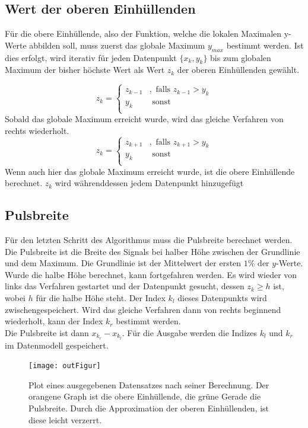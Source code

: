 \subsection{Wert der oberen Einhüllenden}\label{subsec:wert-der-oberen-einhüllenden}
Für die obere Einhüllende, also der Funktion, welche die lokalen Maximalen y-Werte abbilden soll, muss zuerst das globale Maximum $y_{max}$ bestimmt werden.
Ist dies erfolgt, wird iterativ für jeden Datenpunkt $\{x_k, y_k\}$ bis zum globalen Maximum der bisher höchste Wert als Wert $z_k$ der oberen Einhüllenden gewählt.

\begin{equation}
    z_k= \begin{cases}
             z_{k-1} & , \text { falls } z_{k-1} > y_k \\
             y_k & \text{ sonst }\\
    \end{cases}\label{eq:auswahl_upper_values_left}
\end{equation}
Sobald das globale Maximum erreicht wurde, wird das gleiche Verfahren von rechts wiederholt.
\begin{equation}
    z_k= \begin{cases}
             z_{k+1} & , \text { falls } z_{k+1} > y_k \\
             y_k & \text{ sonst }\\
    \end{cases}\label{eq:auswahl_upper_values_right}
\end{equation}
Wenn auch hier das globale Maximum erreicht wurde, ist die obere Einhüllende berechnet.
$z_k$ wird währenddessen jedem Datenpunkt hinzugefügt

\subsection{Pulsbreite}\label{subsec:pulsbreite}
Für den letzten Schritt des Algorithmus muss die Pulsbreite berechnet werden.
Die Pulsbreite ist die Breite des Signals bei halber Höhe zwischen der Grundlinie und dem Maximum.
Die Grundlinie ist der Mittelwert der ersten $1\% \text{ der } y$-Werte.
Wurde die halbe Höhe berechnet, kann fortgefahren werden.
Es wird wieder von links das Verfahren gestartet und der Datenpunkt gesucht, dessen $z_k \geq h$ ist, wobei $h$ für die halbe Höhe steht.
Der Index $k_l$ dieses Datenpunkts wird zwischengespeichert.
Wird das gleiche Verfahren dann von rechts beginnend wiederholt, kann der Index $k_r$ bestimmt werden.\\
Die Pulsbreite ist dann $x_{k_r} - x_{k_l}$.
Für die Ausgabe werden die Indizes $k_l \text{ und } k_r$ im Datenmodell gespeichert.

\begin{figure}[h]
    \centering
    \texttt{[image: outFigur]}
    \caption{Plot eines ausgegebenen Datensatzes nach seiner Berechnung.
    Der orangene Graph ist die obere Einhüllende, die grüne Gerade die Pulsbreite.
    Durch die Approximation der oberen Einhüllenden, ist diese leicht verzerrt.}
    \label{fig:outplot}
\end{figure}
